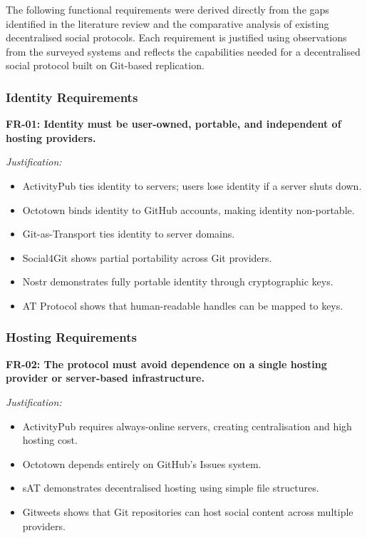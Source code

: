 The following functional requirements were derived directly from the gaps identified in the literature review and the comparative analysis of existing decentralised social protocols. Each requirement is justified using observations from the surveyed systems and reflects the capabilities needed for a decentralised social protocol built on Git-based replication.

\subsubsection*{Identity Requirements}

\textbf{FR-01: Identity must be user-owned, portable, and independent of hosting providers.}

\textit{Justification:}
\begin{itemize}
    \item ActivityPub ties identity to servers; users lose identity if a server shuts down.
    \item Octotown binds identity to GitHub accounts, making identity non-portable.
    \item Git-as-Transport ties identity to server domains.
    \item Social4Git shows partial portability across Git providers.
    \item Nostr demonstrates fully portable identity through cryptographic keys.
    \item AT Protocol shows that human-readable handles can be mapped to keys.
\end{itemize}

\subsubsection*{Hosting Requirements}

\textbf{FR-02: The protocol must avoid dependence on a single hosting provider or server-based infrastructure.}

\textit{Justification:}
\begin{itemize}
    \item ActivityPub requires always-online servers, creating centralisation and high hosting cost.
    \item Octotown depends entirely on GitHub’s Issues system.
    \item sAT demonstrates decentralised hosting using simple file structures.
    \item Gitweets shows that Git repositories can host social content across multiple providers.
\end{itemize}


